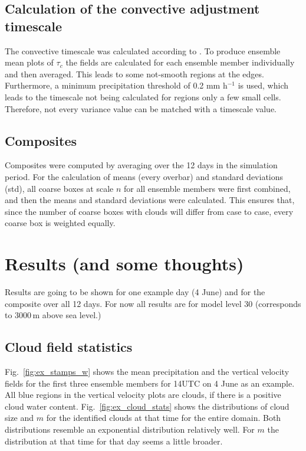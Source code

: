\documentclass[a4paper, 12pt]{article}
\begin{document}
\subsection{Calculation of the convective adjustment timescale}
The convective timescale was calculated according to \cite{Flack2016}. To produce ensemble mean plots of $\tau_c$ the fields are calculated for each ensemble member individually and then averaged. This leads to some not-smooth regions at the edges. Furthermore, a minimum precipitation threshold of 0.2 mm h$^{-1}$ is used, which leads to the timescale not being calculated for regions only a few small cells. Therefore, not every variance value can be matched with a timescale value. 

\subsection{Composites}
Composites were computed by averaging over the 12 days in the simulation period. For the calculation of means (every overbar) and standard deviations (std), all coarse boxes at scale $n$ for all ensemble members were first combined, and then the means and standard deviations were calculated. This ensures that, since the number of coarse boxes with clouds will differ from case to case, every coarse box is weighted equally. 

\section{Results (and some thoughts)}
Results are going to be shown for one example day (4 June) and for the composite over all 12 days. For now all results are for model level 30 (corresponds to 3000\,m above sea level.)

\subsection{Cloud field statistics}
Fig.~\ref{fig:ex_stamps_w} shows the mean precipitation and the vertical velocity fields for the first three ensemble members for 14UTC on 4 June as an example. All blue regions in the vertical velocity plots are clouds, if there is a positive cloud water content. Fig.~\ref{fig:ex_cloud_stats} shows the distributions of cloud size and $m$ for the identified clouds at that time for the entire domain. Both distributions resemble an exponential distribution relatively well. For $m$ the distribution at that time for that day seems a little broader. 
\end{document}

